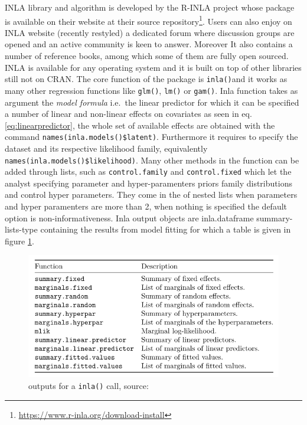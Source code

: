 \documentclass[
  12pt,
  a4paper,
  oneside]{book}
\newcommand{\passthrough}[1]{#1}
\DeclareRobustCommand{\href}[2]{#2\footnote{\url{#1}}}
\theoremstyle{definition}
\theoremstyle{definition}
\theoremstyle{definition}
\theoremstyle{remark}
\begin{document}
INLA library and algorithm is developed by the R-INLA project whose package is available on their website at their \href{https://www.r-inla.org/download-install}{source repository}. Users can also enjoy on INLA website (recently restyled) a dedicated forum where discussion groups are opened and an active community is keen to answer. Moreover It also contains a number of reference books, among which some of them are fully open sourced. INLA is available for any operating system and it is built on top of other libraries still not on CRAN.
The core function of the package is \passthrough{\lstinline!inla()!}and it works as many other regression functions like \passthrough{\lstinline!glm()!}, \passthrough{\lstinline!lm()!} or \passthrough{\lstinline!gam()!}. Inla function takes as argument the \emph{model formula} i.e.~the linear predictor for which it can be specified a number of linear and non-linear effects on covariates as seen in eq. \eqref{eq:linearpredictor}, the whole set of available effects are obtained with the command \passthrough{\lstinline!names(inla.models()$latent)!}. Furthermore it requires to specify the dataset and its respective likelihood family, equivalently \passthrough{\lstinline!names(inla.models()$likelihood)!}.
Many other methods in the function can be added through lists, such as \passthrough{\lstinline!control.family!} and \passthrough{\lstinline!control.fixed!} which let the analyst specifying parameter and hyper-paramenters priors family distributions and control hyper parameters. They come in the of nested lists when parameters and hyper paramenters are more than 2, when nothing is specified the default option is non-informativeness.
Inla output objects are inla.dataframe summary-lists-type containing the results from model fitting for which a table is given in figure \ref{fig:summartable}.

\begin{figure}
\centering
\includegraphics{images/summarytable.PNG}
\caption{\label{fig:summartable}outputs for a \passthrough{\lstinline!inla()!} call, source: \citet{Krainski-Rubio}}
\end{figure}
\end{document}
